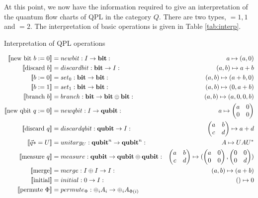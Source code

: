 At this point, we now have the information required to give an interpretation of the quantum flow
charts of QPL in the category $Q$. There are two types, \interp{\bit{}}$= 1,1$ and
\interp{\qubit{}}$=2$. The interpretation of basic operations is given in Table \ref{tab:interp}.
\begin{table*}[ht]
  \caption{Interpretation of QPL operations}
  \begin{center}
    \begin{eqnarray*}
      \interp{\text{new bit }b:=0} &=newbit:I\to \bit: & a\mapsto (a,0)\\
      \interp{\text{discard }b} &=discardbit:\bit\to I: & (a,b)\mapsto a+b\\
      \interp{b:=0} &=set_{0}:\bit\to\bit:&(a,b)\mapsto(a+b,0)\\
      \interp{b:=1} &=set_{1}:\bit\to\bit:&(a,b)\mapsto(0,a+b)\\
      \interp{\text{branch }b}&=branch: \bit\to\bit\+\bit:&(a,b)\mapsto(a,0,0,b)\\
      \interp{\text{new qbit }q:=0} &=newqbit:I\to \qbit:
        & a\mapsto \begin{pmatrix}a&0\\0&0\end{pmatrix}\\
      \interp{\text{discard }q} &=discardqbit:\qbit\to I:
        & \begin{pmatrix}a&b\\c&d\end{pmatrix}\mapsto a+d\\
      \interp{\vec{q}*=U} &=unitary_{U}:\qbit^{n}\to\qbit^{n}:&A\mapsto UAU^{*}\\
      \interp{\text{measure }q}&=measure: \qbit\to\qbit\+\qbit :
        &\begin{pmatrix}a&b\\c&d\end{pmatrix}\mapsto(\begin{pmatrix}a&0\\0&0\end{pmatrix},
        \begin{pmatrix}0&0\\0&d\end{pmatrix})\\
      \interp{\text{merge}} &= merge:I\+I \to I : &(a,b)\mapsto (a+b)\\
      \interp{\text{initial}}&=initial: 0 \to I : &() \mapsto 0\\
      \interp{\text{permute }\Phi} &= permute_{\Phi}: \+_{i}A_{i} \to \+_{i}A_{\Phi(i)}
    \end{eqnarray*}
  \end{center}
  \label{tab:interp}
\end{table*}


